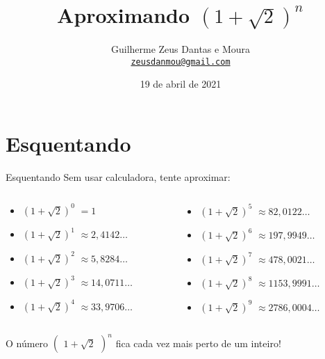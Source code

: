 \documentclass[aspectratio=169, handout]{beamer}
\title[Aproximando potências]{Aproximando $\left(1+\sqrt{2}\right)^n$}
\subtitle{\vspace{1em}{\tiny Adaptado de Dmitry Fuchs, UC Davis, em Berkeley Math Circle 2015-2016\footnote{O material original está disponível \href{https://mathcircle.berkeley.edu/circle-archives/handouts/2015-2016}{aqui}.}.}}
\author
{Guilherme Zeus Dantas e Moura\\\tiny \href{mailto:zeusdanmou@gmail.com}{\texttt{zeusdanmou@gmail.com}}}
\institute{Matematicamente}
\date
{19 de abril de 2021}
\begin{document}
\begin{frame}
  \titlepage
\end{frame}

\section{Esquentando}

\begin{frame}{Esquentando}{}
	Sem usar calculadora, tente aproximar:
	\begin{columns}
		\begin{column}{5cm}
			\begin{itemize}
				\item $\left(1+\sqrt{2}\right)^0$ \pause $= 1$
				\item $\left(1+\sqrt{2}\right)^1$ \pause $\approx  2{,}4142\dots$
				\item $\left(1+\sqrt{2}\right)^2$ \pause $\approx  5{,}8284\dots$
				\item $\left(1+\sqrt{2}\right)^3$ \pause $\approx 14{,}0711\dots$
				\item $\left(1+\sqrt{2}\right)^4$ \pause $\approx 33{,}9706\dots$
			\end{itemize}
		\end{column}
		\begin{column}{6cm}
			\begin{itemize}
				\item $\left(1+\sqrt{2}\right)^5$ \pause $\approx 82{,}0122\dots$
				\item $\left(1+\sqrt{2}\right)^6$ \pause $\approx 197{,}9949\dots$
				\item $\left(1+\sqrt{2}\right)^7$ \pause $\approx 478{,}0021\dots$
				\item $\left(1+\sqrt{2}\right)^8$ \pause $\approx 1153{,}9991\dots$
				\item $\left(1+\sqrt{2}\right)^9$ \pause $\approx 2786{,}0004\dots$
			\end{itemize}
		\end{column}
	\end{columns}

	\vspace{1em}
	\pause O número $\begin{pmatrix}1+\sqrt{2}\end{pmatrix}^n$ fica cada vez mais perto de um inteiro!
\end{frame}
\end{document}
